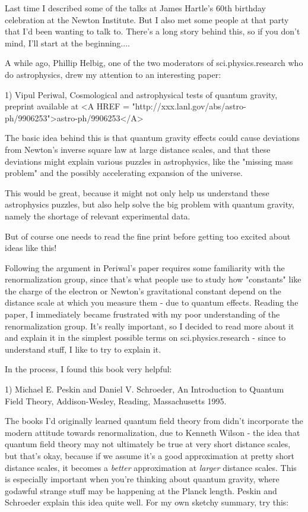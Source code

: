 


Last time I described some of the talks at James Hartle's 60th birthday 
celebration at the Newton Institute.  But I also met some people at that 
party that I'd been wanting to talk to.  There's a long story behind this, 
so if you don't mind, I'll start at the beginning....

A while ago, Phillip Helbig, one of the two moderators of 
sci.physics.research who do astrophysics, drew my attention to an 
interesting paper: 

1) Vipul Periwal, Cosmological and astrophysical tests of 
quantum gravity, preprint available at <A HREF = "http://xxx.lanl.gov/abs/astro-ph/9906253">astro-ph/9906253</A>

The basic idea behind this is that quantum gravity effects could cause 
deviations from Newton's inverse square law at large distance scales, and 
that these deviations might explain various puzzles in astrophysics, like 
the "missing mass problem" and the possibly accelerating expansion of the 
universe.  

This would be great, because it might not only help us understand these 
astrophysics puzzles, but also help solve the big problem with quantum 
gravity, namely the shortage of relevant experimental data.

But of course one needs to read the fine print before getting too excited 
about ideas like this!

Following the argument in Periwal's paper requires some familiarity 
with the renormalization group, since that's what people use to study 
how "constants" like the charge of the electron or Newton's gravitational 
constant depend on the distance scale at which you measure them - due 
to quantum effects.  Reading the paper, I immediately became frustrated 
with my poor understanding of the renormalization group.  It's really 
important, so I decided to read more about it and explain it in the 
simplest possible terms on sci.physics.research - since to understand 
stuff, I like to try to explain it.  

In the process, I found this book very helpful:

1) Michael E. Peskin and Daniel V. Schroeder, An Introduction 
to Quantum Field Theory, Addison-Wesley, Reading, Massachusetts 
1995. 

The books I'd originally learned quantum field theory from didn't 
incorporate the modern attitude towards renormalization, due to 
Kenneth Wilson - the idea that quantum field theory may not 
ultimately be true at very short distance scales, but that's
okay, because if we assume it's a good approximation at pretty 
short distance scales, it becomes a \emph{better} approximation at 
\emph{larger} distance scales.  This is especially important when you're 
thinking about quantum gravity, where godawful strange stuff may be 
happening at the Planck length.  Peskin and Schroeder explain this 
idea quite well.  For my own sketchy summary, try this:

